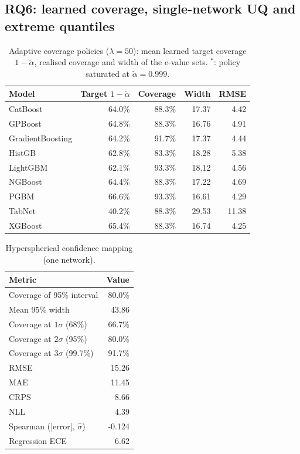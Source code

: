 \documentclass[11pt]{article}
\begin{document}
\subsection{RQ6: learned coverage, single-network UQ and extreme quantiles}
\begin{table}[t]\centering\small
\caption{Adaptive coverage policies ($\lambda=50$): mean learned target coverage $1-\tilde\alpha$, realised coverage and width of the e-value sets. $^\ast$: policy saturated at $\tilde\alpha=0.999$.}\label{tab:acp}
\begin{tabular}{lrrrr}\toprule Model & Target $1-\tilde\alpha$ & Coverage & Width & RMSE\\\midrule
CatBoost & 64.0\% & 88.3\% & 17.37 & 4.42\\
GPBoost & 64.8\% & 88.3\% & 16.76 & 4.91\\
GradientBoosting & 64.2\% & 91.7\% & 17.37 & 4.44\\
HistGB & 62.8\% & 83.3\% & 18.28 & 5.38\\
LightGBM & 62.1\% & 93.3\% & 18.12 & 4.56\\
NGBoost & 64.4\% & 88.3\% & 17.22 & 4.69\\
PGBM & 66.6\% & 93.3\% & 16.61 & 4.29\\
TabNet & 40.2\% & 88.3\% & 29.53 & 11.38\\
XGBoost & 65.4\% & 88.3\% & 16.74 & 4.25\\
\bottomrule\end{tabular}\end{table}
\begin{table}[t]\centering\small
\caption{Hyperspherical confidence mapping (one network).}\label{tab:hcm}
\begin{tabular}{lr}\toprule Metric & Value\\\midrule
Coverage of 95\% interval & 80.0\%\\
Mean 95\% width & 43.86\\
Coverage at $1\sigma$ (68\%) & 66.7\%\\
Coverage at $2\sigma$ (95\%) & 80.0\%\\
Coverage at $3\sigma$ (99.7\%) & 91.7\%\\
RMSE & 15.26\\
MAE & 11.45\\
CRPS & 8.66\\
NLL & 4.39\\
Spearman (|error|, $\hat\sigma$) & -0.124\\
Regression ECE & 6.62\\
\bottomrule\end{tabular}\end{table}
\end{document}
